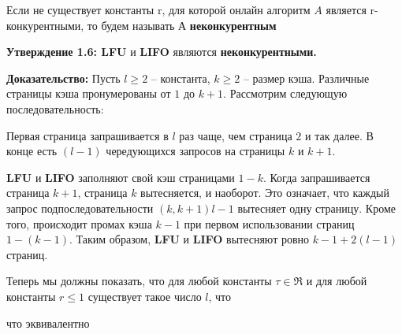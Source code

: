 Если не существует константы r, для которой онлайн алгоритм $A$ является r-конкурентными, то будем называть $А$ \textbf{неконкурентным}

\vspace{\baselineskip}

\textbf{Утверждение 1.6: LFU} и \textbf{LIFO} являются \textbf{неконкурентными.}

\vspace{\baselineskip}

\textbf{Доказательство:} Пусть $l \geqslant 2$ – константа, $k \geqslant 2$ – размер кэша. Различные страницы кэша пронумерованы от $1$ до $k+1$. Рассмотрим следующую последовательность:

\vspace{\baselineskip}


\vspace{\baselineskip}

Первая страница запрашивается в $l$ раз чаще, чем страница $2$ и так далее. В конце есть $(l-1)$ чередующихся запросов на страницы $k$ и $k+1$.

\textbf{LFU} и \textbf{LIFO} заполняют свой кэш страницами $1-k$. Когда запрашивается страница $k+1$, страница $k$ вытесняется, и наоборот. Это означает, что каждый запрос подпоследовательности $(k, k+1)l-1$ вытесняет одну страницу. Кроме того, происходит промах кэша $k-1$ при первом использовании страниц $1-(k-1)$. Таким образом, \textbf{LFU} и \textbf{LIFO} вытесняют ровно $k-1+2(l-1)$ страниц.

\vspace{\baselineskip}

Теперь мы должны показать, что для любой константы $\tau \in \Re$ и для любой константы $r \leqslant 1$ существует такое число $l$, что

\vspace{\baselineskip}


\vspace{\baselineskip}

что эквивалентно

\vspace{\baselineskip}


